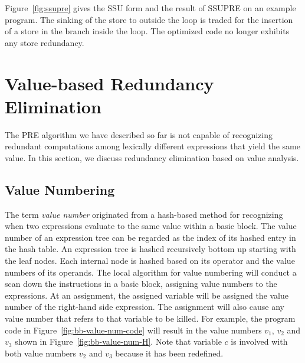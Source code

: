 Figure~\ref{fig:ssupre} gives the SSU form and the result of SSUPRE on an example program. 
The sinking of the store to outside the loop is traded for the insertion of a store in the branch inside the loop. 
The optimized code no longer exhibits any store redundancy.

\section{Value-based Redundancy Elimination}
\label{section:Part3:Pre_not_helped:SemanticPRE}
The PRE algorithm we have described so far is not capable of recognizing redundant computations among lexically different expressions that yield the same value. 
In this section, we discuss redundancy elimination based on value analysis.

\subsection{Value Numbering}
\label{sec:pre_not_helped:GVN}  
The term \emph{value number} originated from a hash-based method for recognizing when two expressions evaluate to the same value within a basic block. 
The value number of an expression tree can be regarded as the index of its hashed entry in the hash table. 
An expression tree is hashed recursively bottom up starting with the leaf nodes. 
Each internal node is hashed based on its operator and the value numbers of its operands. 
The local algorithm for value numbering will conduct a scan down the instructions in a basic block, assigning value numbers to the expressions. 
At an assignment, the assigned variable will be assigned the value number of the right-hand side expression. 
The assignment will also cause any value number that refers to that variable to be killed. 
For example, the program code in Figure~\ref{fig:bb-value-num-code} will result in the value numbers $v_1$, $v_2$ and $v_3$ shown in Figure~\ref{fig:bb-value-num-H}. 
Note that variable $c$ is involved with both value numbers $v_2$ and $v_3$ because it has been redefined.

